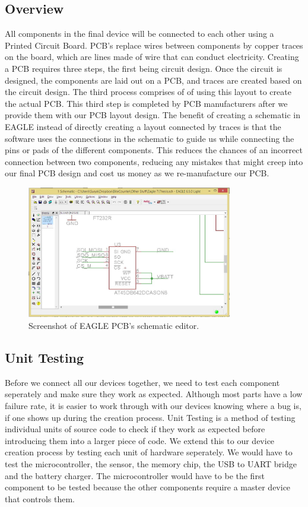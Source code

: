 \subsection{Overview}
\label{Sec:PCBDesign}
All components in the final device will be connected to each other using a Printed Circuit Board.
PCB's replace wires between components by copper traces on the board,
which are lines made of wire that can conduct electricity.
Creating a PCB requires three steps, the first being circuit design.
Once the circuit is designed, the components are laid out on a PCB, and traces are created based on the circuit design.
The third process comprises of of using this layout to create the actual PCB.
This third step is completed by PCB manufacturers after we provide them with our PCB layout design.
The benefit of creating a schematic in EAGLE instead of directly creating a layout connected by traces
is that the software uses the connections in the schematic to guide us while connecting the pins or pads of the different components.
This reduces the chances of an incorrect connection between two components,
reducing any mistakes that might creep into our final PCB design and cost us money as we re-manufacture our PCB.
\begin{figure}
\begin{center}
\includegraphics[width=0.8\textwidth]{images/EagleScreen.jpg}
\caption{Screenshot of EAGLE PCB's schematic editor.}
\label{Fig:EaglePCBScreen}
\end{center}
\end{figure}

\subsection{Unit Testing}
\label{Sec:UnitTesting}
Before we connect all our devices together,
we need to test each component seperately and make sure they work as expected.
Although most parts have a low failure rate,
it is easier to work through with our devices knowing where a bug is,
if one shows up during the creation process.
Unit Testing is a method of testing individual units of source code to check if they work as expected before introducing them into a larger piece of code.
We extend this to our device creation process by testing each unit of hardware seperately.
We would have to test the microcontroller, the sensor, the memory chip, the USB to UART bridge and the battery charger.
The microcontroller would have to be the first component to be tested because the other components require a master device that controls them.

